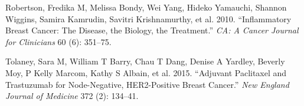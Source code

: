 \documentclass[
  letterpaper,
  DIV=11,
  numbers=noendperiod]{scrartcl}
\newlength{\cslhangindent}
\newenvironment{CSLReferences}[2] %
 {\begin{list}{}{%
  \setlength{\itemindent}{0pt}
  \setlength{\leftmargin}{0pt}
  \setlength{\parsep}{0pt}
  \ifodd #1
   \setlength{\leftmargin}{\cslhangindent}
   \setlength{\itemindent}{-1\cslhangindent}
  \fi
  \setlength{\itemsep}{#2\baselineskip}}}
 {\end{list}}
\begin{document}
\begin{CSLReferences}{1}{0}
Robertson, Fredika M, Melissa Bondy, Wei Yang, Hideko Yamauchi, Shannon
Wiggins, Samira Kamrudin, Savitri Krishnamurthy, et al. 2010.
{``Inflammatory Breast Cancer: The Disease, the Biology, the
Treatment.''} \emph{CA: A Cancer Journal for Clinicians} 60 (6):
351--75.

Tolaney, Sara M, William T Barry, Chau T Dang, Denise A Yardley, Beverly
Moy, P Kelly Marcom, Kathy S Albain, et al. 2015. {``Adjuvant Paclitaxel
and Trastuzumab for Node-Negative, HER2-Positive Breast Cancer.''}
\emph{New England Journal of Medicine} 372 (2): 134--41.

\end{CSLReferences}
\end{document}
